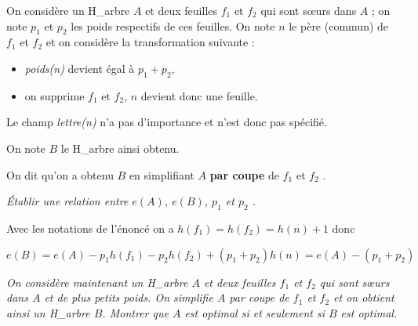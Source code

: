 On considère un H\_arbre $A$ et deux feuilles $f_1$ et $f_2$ qui sont sœurs dans $A$ ; on note $p_1$ et $p_2$ les poids respectifs de ces feuilles. On note $n$ le père (commun) de $f_1$ et $f_2$ et on considère la transformation suivante :
\begin{itemize}
  \item {\it poids(n)} devient égal à $p_1+p_2$,
  \item  on supprime $f_1$ et $f_2$, $n$ devient donc une feuille.
\end{itemize}
Le champ {\it lettre(n)} n’a pas d’importance et n’est donc pas spécifié.

On note $B$ le H\_arbre ainsi obtenu.

On dit qu’on a obtenu $B$ en simplifiant $A$ {\bf par coupe} de $f_1$ et $f_2$ .
\begin{Exercise}\it
Établir une relation entre $e(A)$, $e(B)$, $p_1$ et $p_2$ .
\end{Exercise}
\begin{Answer}
 Avec les notations de l'énoncé on a $h(f_1)=h(f_2)=h(n)+1$ donc

$e(B)=e(A)-p_1h(f_1)-p_2h(f_2)+(p_1+p_2)h(n)=e(A)-(p_1+p_2)$
\end{Answer}
\begin{Exercise}[label=ques:coupe_opt]\it
On considère maintenant un H\_arbre $A$ et deux feuilles $f_1$ et $f_2$ qui sont sœurs dans $A$ et de plus
petits poids. On simplifie $A$ par coupe de $f_1$ et $f_2$ et on obtient ainsi un H\_arbre $B$. Montrer que $A$ est
optimal si et seulement si $B$ est optimal.
\end{Exercise}
